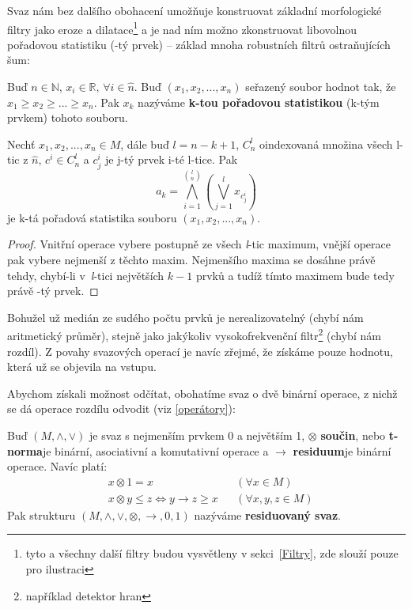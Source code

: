     Svaz nám bez dalšího obohacení umožňuje konstruovat základní morfologické filtry jako eroze a dilatace\footnote{tyto a všechny další filtry budou vysvětleny v sekci~\ref{Filtry}, zde slouží pouze pro ilustraci} a je nad ním možno zkonstruovat libovolnou pořadovou statistiku (\kk-tý prvek) -- základ mnoha robustních filtrů ostraňujících šum:

    \begin{define}\label{def k-prvek}
      Buď $n \in \mathbb{N}$, $x_i \in \mathbb{R}, \,\forall i \in \widehat n$. Buď $(x_1,x_2,...,x_n)$ seřazený soubor hodnot tak, že $x_1 \geq x_2 \geq ... \geq x_n$. Pak $x_k$ nazýváme \textbf{k-tou pořadovou statistikou} (k-tým prvkem) tohoto souboru.
    \end{define}

    \begin{theo}\label{theo k-tý prvek}
      Nechť $x_1,x_2,...,x_n \in M$, dále buď $l = n-k+1$, $C^{l}_n$ oindexovaná množina všech l-tic z $\widehat n$, $c^i \in C^{l}_n$ a $c^i_j$ je j-tý prvek i-té l-tice. Pak
      \[
        a_k = \bigwedge_{i = 1}^{{l}\choose{n}}\left( \bigvee_{j = 1}^{l} x_{c_{j}^i} \right)
      \]
      je k-tá pořadová statistika souboru $(x_1,x_2,...,x_n)$.
    \end{theo}
    \begin{proof}
      Vnitřní operace vybere postupně ze všech \textit{l}-tic maximum, vnější operace pak vybere nejmenší z těchto maxim. Nejmenšího maxima se dosáhne právě tehdy, chybí-li v~\textit{l}-tici největších $k-1$ prvků a tudíž tímto maximem bude tedy právě \kk-tý prvek.
    \end{proof}

    Bohužel už medián ze sudého počtu prvků je nerealizovatelný (chybí nám aritmetický průměr), stejně jako jakýkoliv vysokofrekvenční filtr\footnote{například detektor hran} (chybí nám rozdíl). Z povahy svazových operací je navíc zřejmé, že získáme pouze hodnotu, která už se objevila na vstupu.

    Abychom získali možnost odčítat, obohatíme svaz o dvě binární operace, z nichž se dá operace rozdílu odvodit (viz \ref{operátory}):

    \begin{define}\label{def residuovaný svaz}
    Buď $(M,\wedge,\vee)$ je svaz s nejmenším prvkem 0 a největším 1, $\otimes$ \rl \textbf{součin}, nebo \textbf{t-norma}\rr je binární, asociativní a komutativní operace a $\rightarrow$ \rl \textbf{residuum}\rr je binární operace. Navíc platí:
    \begin{align}
    &x \otimes 1 = x  &&(\forall x \in M)\\
    &x \otimes y \leq z \Leftrightarrow y \rightarrow z \geq x &&(\forall x,y,z \in M)\label{Galoisova koresp}
    \end{align}
    Pak strukturu $(M,\wedge,\vee,\otimes,\rightarrow,0,1)$ nazýváme \textbf{residuovaný svaz}.
    \end{define}

